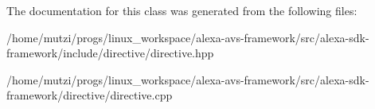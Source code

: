 The documentation for this class was generated from the following files\+:\begin{DoxyCompactItemize}
\item 
/home/mutzi/progs/linux\+\_\+workspace/alexa-\/avs-\/framework/src/alexa-\/sdk-\/framework/include/directive/directive.\+hpp\item 
/home/mutzi/progs/linux\+\_\+workspace/alexa-\/avs-\/framework/src/alexa-\/sdk-\/framework/directive/directive.\+cpp\end{DoxyCompactItemize}
